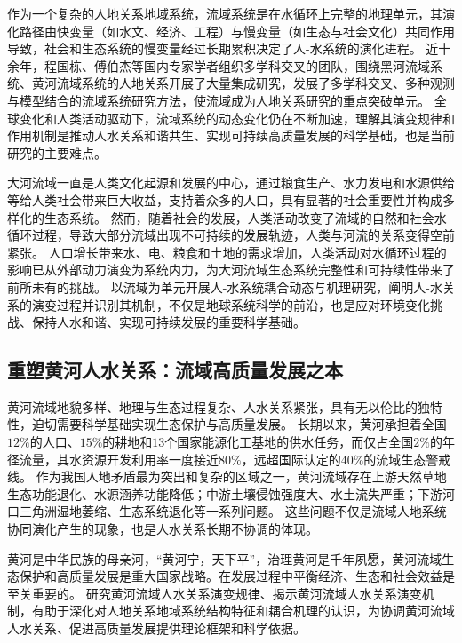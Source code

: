 作为一个复杂的人地关系地域系统，流域系统是在水循环上完整的地理单元，其演化路径由快变量（如水文、经济、工程）与慢变量（如生态与社会文化）共同作用导致，社会和生态系统的慢变量经过长期累积决定了人-水系统的演化进程\cite{falkenmark2021}。
近十余年，程国栋、傅伯杰等国内专家学者组织多学科交叉的团队，围绕黑河流域系统、黄河流域系统的人地关系开展了大量集成研究，发展了多学科交叉、多种观测与模型结合的流域系统研究方法，使流域成为人地关系研究的重点突破单元\cite{cheng2014, fu2021a}。
全球变化和人类活动驱动下，流域系统的动态变化仍在不断加速，理解其演变规律和作用机制是推动人水关系和谐共生、实现可持续高质量发展的科学基础，也是当前研究的主要难点\cite{reyers2018}。

大河流域一直是人类文化起源和发展的中心，通过粮食生产、水力发电和水源供给等给人类社会带来巨大收益，支持着众多的人口，具有显著的社会重要性并构成多样化的生态系统\cite{best2019}。
然而，随着社会的发展，人类活动改变了流域的自然和社会水循环过程，导致大部分流域出现不可持续的发展轨迹，人类与河流的关系变得空前紧张\cite{best2019, best2020}。
人口增长带来水、电、粮食和土地的需求增加，人类活动对水循环过程的影响已从外部动力演变为系统内力，为大河流域生态系统完整性和可持续性带来了前所未有的挑战\cite{crutzen2006, dibaldassarre2019}。
以流域为单元开展人-水系统耦合动态与机理研究，阐明人-水关系的演变过程并识别其机制，不仅是地球系统科学的前沿，也是应对环境变化挑战、保持人水和谐、实现可持续发展的重要科学基础。

\subsection{重塑黄河人水关系：流域高质量发展之本}

黄河流域地貌多样、地理与生态过程复杂、人水关系紧张，具有无以伦比的独特性，迫切需要科学基础实现生态保护与高质量发展。
长期以来，黄河承担着全国$12\%$的人口、$15\%$的耕地和$13$个国家能源化工基地的供水任务，而仅占全国$2\%$的年径流量，其水资源开发利用率一度接近$80\%$，远超国际认定的$40\%$的流域生态警戒线\cite{fu2021a}。
作为我国人地矛盾最为突出和复杂的区域之一，黄河流域存在上游天然草地生态功能退化、水源涵养功能降低；中游土壤侵蚀强度大、水土流失严重；下游河口三角洲湿地萎缩、生态系统退化等一系列问题\cite{mazhuguo2020}。
这些问题不仅是流域人地系统协同演化产生的现象，也是人水关系长期不协调的体现\cite{fu2021a}。

黄河是中华民族的母亲河，“黄河宁，天下平”，治理黄河是千年夙愿，黄河流域生态保护和高质量发展是重大国家战略。在发展过程中平衡经济、生态和社会效益是至关重要的。
研究黄河流域人水关系演变规律、揭示黄河流域人水关系演变机制，有助于深化对人地关系地域系统结构特征和耦合机理的认识，为协调黄河流域人水关系、促进高质量发展提供理论框架和科学依据。
